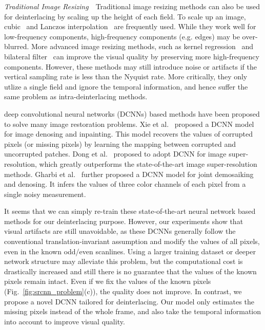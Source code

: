\documentclass[acmtog]{acmart}
\begin{document}
\vspace{0.15in}\noindent\emph{Traditional Image Resizing}\,\,\,\,
Traditional image resizing
methods can also be used for deinterlacing by scaling up the height of each field.
To scale up an image, cubic~\cite{mitchell1988reconstruction} and
Lanczos interpolation~\cite{duchon1979lanczos} are frequently used. While they work well for low-frequency components, high-frequency components 
(e.g. edges) may be over-blurred. More advanced image resizing methods, 
such as kernel regression~\cite{takeda2007kernel} and
bilateral filter~\cite{hung2012fast} can improve the
visual quality by preserving more high-frequency components. 
However, these methods may still introduce noise or artifacts 
if the vertical sampling rate is less than the Nyquist rate. 
More critically, they only utlize a single field and ignore the temporal information, 
and hence suffer the same problem as intra-deinterlacing methods.

deep convolutional neural networks (DCNNs) based methods have been proposed to solve 
many image restoration problems.
Xie et al.~ proposed a DCNN model for
image denosing and inpainting. This model recovers the values of corrupted
pixels (or missing pixels) by learning the mapping between corrupted and
uncorrupted patches. Dong et al.~ proposed to adopt
DCNN for image super-resolution, which greatly outperforms the state-of-the-art
image super-resolution methods. Gharbi et al.~ further
proposed a DCNN model for joint demosaiking and denosing. It infers
the values of three color channels of each pixel from a single noisy
measurement.


It seems that we can simply re-train these state-of-the-art 
neural network based methods for our deinterlacing purpose. 
However, our experiments show that visual artifacts are still unavoidable, as 
these DCNNs generally follow the conventional translation-invariant assumption and
modify the values of all pixels, even in the known odd/even scanlines.  Using a larger
training dataset or deeper network structure may alleviate this problem, but the
computational cost is drastically increased and still there is no guarantee 
that the values of the known pixels remain intact. 
Even if we fix the values of the known pixels (Fig.~\ref{fig:srcnn_problem}(c)), 
the quality does not improve. 
In contrast, we propose a novel DCNN tailored for deinterlacing.
Our model only estimates the missing pixels instead of the whole frame, and also
take the temporal information into account to improve visual quality.
\end{document}
